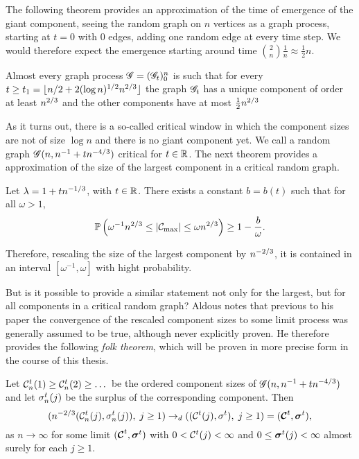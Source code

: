 The following theorem provides an approximation of the time of emergence of the giant component,
seeing the random graph on $n$ vertices as a graph process,
starting at $t=0$ with $0$ edges, adding one random edge at every time step.
We would therefore expect the emergence starting around time $\binom{2}{n}\frac{1}{n} \approx \frac{1}{2}n$. 

\begin{theorem}
	Almost every graph process $\mathscr{G} = (\mathscr{G}_t)_0^n$ is such that 
	for every $t \geq t_1 = \lfloor n/2 + 2(\log n)^{1/2}n^{2 / 3} \rfloor$ 
	the graph $\mathscr{G}_t$ has a unique component of order at least $n^{2 / 3}$ and the other components have at most $\frac{1}{2}n^{2 / 3}$
\end{theorem}

As it turns out, there is a so-called critical window in which the component sizes are not of size $\log n$ and there is no giant component yet.
We call a random graph $\mathscr{G}(n, n^{-1} + tn^{-4 / 3})$ critical for $t \in \mathbb{R}$.
The next theorem provides a approximation of the size of the largest component in a critical random graph.

\begin{theorem} \label{T: largest critical cluster}
	Let $\lambda = 1 + tn^{-1 / 3}$, with $t \in \mathbb{R}$.
	There exists a constant $b = b(t)$ such that for all $\omega > 1$,
	\begin{equation}
		\mathbb{P}\left( \omega^{-1} n^{2 / 3} \leq |\mathcal{C}_{\max}| \leq \omega n^{2 / 3}\right) \geq 1 - \frac{b}{\omega}.
	\end{equation}	
\end{theorem}

Therefore, rescaling the size of the largest component by $n^{-2 / 3}$,
it is contained in an interval $[\omega^{-1}, \omega]$ with hight probability.

But is it possible to provide a similar statement not only for the largest, but for all components in a critical random graph?
Aldous notes that previous to his paper
the convergence of the rescaled component sizes to some limit process was generally assumed to be true,
although never explicitly proven.
He therefore provides the following \emph{folk theorem},
which will be proven in more precise form in the course of this thesis.

\begin{folktheorem} \label{T: folk theorem}
	Let $\mathcal{C}^t_n(1) \geq \mathcal{C}^t_n(2) \geq \dots$ be the ordered component sizes of
	$\mathscr{G}(n, n^{-1} + tn^{-4 / 3})$ and let $\mathcal{\sigma}^t_n(j)$ be the surplus of the corresponding component.
	Then
	\begin{equation}
		( n^{-2 / 3} ( \mathcal{C}^t_n(j), \mathcal{\sigma}^t_n(j) ), \; j \geq 1 ) 
		\rightarrow_d
		( (\mathcal{C}^t(j), \mathcal{\sigma}^t), \; j \geq 1 )
		= ( \boldsymbol{\mathcal{C}}^t, \boldsymbol{\mathcal{\sigma}}^t ),
	\end{equation}
	as $n \rightarrow \infty$ for some limit $( \boldsymbol{\mathcal{C}}^t, \boldsymbol{\mathcal{\sigma}}^t )$
	with $0 < \mathcal{C}^t(j) < \infty$ and $0 \leq \boldsymbol{\mathcal{\sigma}}^t(j) < \infty$ almost surely for each $j \geq 1$.
\end{folktheorem}



